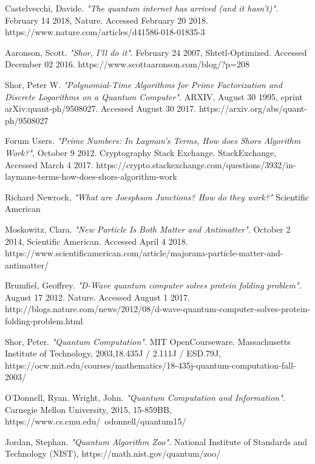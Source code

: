 \documentclass[a4paper]{article}
\begin{document}
\begin{thebibliography}{9}
	Castelvecchi, Davide. \emph{"The quantum internet has arrived (and it hasn’t)"}.  February 14 2018, Nature.  Accessed February 20 2018. https://www.nature.com/articles/d41586-018-01835-3

	Aaronson, Scott. \emph{"Shor, I'll do it"}. February 24 2007, Shtetl-Optimized. Accessed December 02 2016. https://www.scottaaronson.com/blog/?p=208

	Shor, Peter W. \emph{"Polynomial-Time Algorithms for Prime Factorization and Discrete Logarithms on a Quantum Computer"}. ARXIV, August 30 1995, eprint arXiv:quant-ph/9508027. Accessed August 30 2017. https://arxiv.org/abs/quant-ph/9508027   

	Forum Users. \emph{"Prime Numbers: In Layman's Terms, How does Shors Algorithm Work?"}, October 9 2012. Cryptography Stack Exchange.  StackExchange, Accessed March 4 2017. https://crypto.stackexchange.com/questions/3932/in-laymans-terms-how-does-shors-algorithm-work

	Richard Newrock,
	\emph{"What are Joesphson Junctions? How do they work?"}
	Scientific American
	
	Moskowitz, Clara. \emph{"New Particle Is Both Matter and Antimatter"}. October 2 2014, Scientific American. Accessed April 4 2018. https://www.scientificamerican.com/article/majorana-particle-matter-and-antimatter/

	Brumfiel, Geoffrey. \emph{"D-Wave quantum computer solves protein folding problem"}. August 17 2012. Nature. Accessed August 1 2017. http://blogs.nature.com/news/2012/08/d-wave-quantum-computer-solves-protein-folding-problem.html
	

	Shor, Peter. \emph{"Quantum Computation".} MIT OpenCourseware. Massachusetts Institute of Technology, 2003,18.435J / 2.111J / ESD.79J, \newline https://ocw.mit.edu/courses/mathematics/18-435j-quantum-computation-fall-2003/

	O'Donnell, Ryan. Wright, John. \emph{"Quantum Computation and Information".} Carnegie Mellon University, 2015, 15-859BB, \newline https://www.cs.cmu.edu/~odonnell/quantum15/

	Jordan, Stephan. \emph{"Quantum Algorithm Zoo".} National Institute of Standards and Technology (NIST),  https://math.nist.gov/quantum/zoo/
	

\end{thebibliography}
\end{document}
